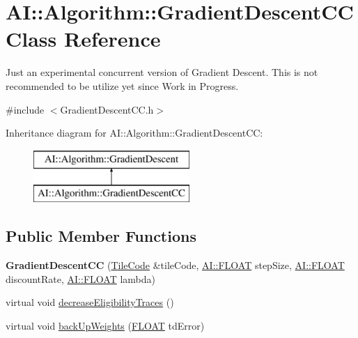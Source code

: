 \hypertarget{classAI_1_1Algorithm_1_1GradientDescentCC}{\section{A\+I\+:\+:Algorithm\+:\+:Gradient\+Descent\+C\+C Class Reference}
\label{classAI_1_1Algorithm_1_1GradientDescentCC}
}


Just an experimental concurrent version of Gradient Descent. This is not recommended to be utilize yet since Work in Progress.  




{\ttfamily \#include $<$Gradient\+Descent\+C\+C.\+h$>$}

Inheritance diagram for A\+I\+:\+:Algorithm\+:\+:Gradient\+Descent\+C\+C\+:\begin{figure}[H]
\begin{center}
\leavevmode
\includegraphics[height=2.000000cm]{classAI_1_1Algorithm_1_1GradientDescentCC}
\end{center}
\end{figure}
\subsection*{Public Member Functions}
\begin{DoxyCompactItemize}
\item 
\hypertarget{classAI_1_1Algorithm_1_1GradientDescentCC_a036943a3f05d8e9146e833d225b13d74}{{\bfseries Gradient\+Descent\+C\+C} (\hyperlink{classAI_1_1Algorithm_1_1TileCode}{Tile\+Code} \&tile\+Code, \hyperlink{namespaceAI_a41b74884a20833db653dded3918e05c3}{A\+I\+::\+F\+L\+O\+A\+T} step\+Size, \hyperlink{namespaceAI_a41b74884a20833db653dded3918e05c3}{A\+I\+::\+F\+L\+O\+A\+T} discount\+Rate, \hyperlink{namespaceAI_a41b74884a20833db653dded3918e05c3}{A\+I\+::\+F\+L\+O\+A\+T} lambda)}\label{classAI_1_1Algorithm_1_1GradientDescentCC_a036943a3f05d8e9146e833d225b13d74}

\item 
virtual void \hyperlink{classAI_1_1Algorithm_1_1GradientDescentCC_a5cd9bd033e8556b4961370da3298cfce}{decrease\+Eligibility\+Traces} ()
\item 
virtual void \hyperlink{classAI_1_1Algorithm_1_1GradientDescentCC_a990c4b429edd9583e0e0a56be43faad8}{back\+Up\+Weights} (\hyperlink{namespaceAI_a41b74884a20833db653dded3918e05c3}{F\+L\+O\+A\+T} td\+Error)
\end{DoxyCompactItemize}
